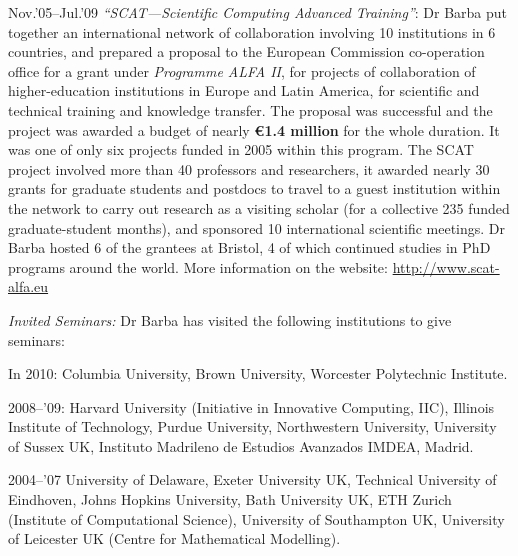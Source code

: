 \documentclass{proposalnsf}
\newlength{\up}
\newlength{\hup}
\begin{document}
\begin{list}{ }{\setlength{\leftmargin}{2.5em}}
	\item[Nov.'05--Jul.'09] \emph{``SCAT---Scientific Computing Advanced Training''}: Dr Barba put together an international network of collaboration involving 10 institutions in 6 countries, and prepared a proposal to the European Commission co-operation office for a grant under \emph{Programme ALFA II}, for projects of collaboration of higher-education institutions in Europe and Latin America, for scientific and technical training and knowledge transfer.   The proposal was  successful and the project was awarded a budget of nearly \textbf{\euro 1.4 million} for the whole duration.  It was one of only six projects funded in 2005 within this program.
The SCAT project involved more than 40 professors and researchers, it awarded nearly 30 grants for graduate students and postdocs to travel to a guest institution within the network to carry out research as a visiting scholar (for a collective 235 funded graduate-student months), and sponsored 10 international scientific meetings. Dr Barba hosted 6 of the grantees at Bristol, 4 of which continued studies in PhD programs around the world. More information on the website:  \url{http://www.scat-alfa.eu}


	\item[\emph{Invited Seminars:}] Dr Barba has visited the following institutions to give seminars: \vspace{\hup}
\item[In 2010:] Columbia University, Brown University, Worcester Polytechnic Institute.\vspace{\hup}
\item[2008--'09:] Harvard University (Initiative in Innovative Computing, IIC), Illinois Institute of Technology, Purdue University, Northwestern University, University of Sussex UK, Instituto Madrileno de Estudios Avanzados IMDEA, Madrid.\vspace{\hup}
\item[2004--'07] University of Delaware, Exeter University UK, Technical University of Eindhoven, Johns Hopkins University,  Bath University UK, ETH Zurich (Institute of Computational Science), University of Southampton UK, University of Leicester UK (Centre for Mathematical Modelling). 
\end{list}




\end{document}
